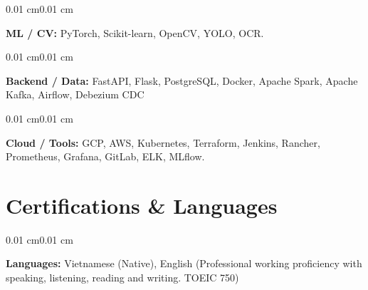\documentclass[10pt, letterpaper]{article}
\newenvironment{onecolentry}{
    \begin{adjustwidth}{0.01 cm}{0.01 cm}
}{
    \end{adjustwidth}
}
\begin{document}
\begin{onecolentry}
\textbf{ML / CV:} PyTorch, Scikit-learn, OpenCV, YOLO, OCR.
\end{onecolentry}

\begin{onecolentry}
\textbf{Backend / Data:} FastAPI, Flask, PostgreSQL, Docker, Apache Spark, Apache Kafka, Airflow, Debezium CDC
\end{onecolentry}

\begin{onecolentry}
\textbf{Cloud / Tools:} GCP, AWS, Kubernetes, Terraform, Jenkins, Rancher, Prometheus, Grafana, GitLab, ELK, MLflow.
\end{onecolentry}

\section{Certifications \& Languages}

\begin{onecolentry}
\textbf{Languages:} Vietnamese (Native), English (Professional working proficiency with speaking, listening, reading and writing. TOEIC 750)
\end{onecolentry}
\end{document}
